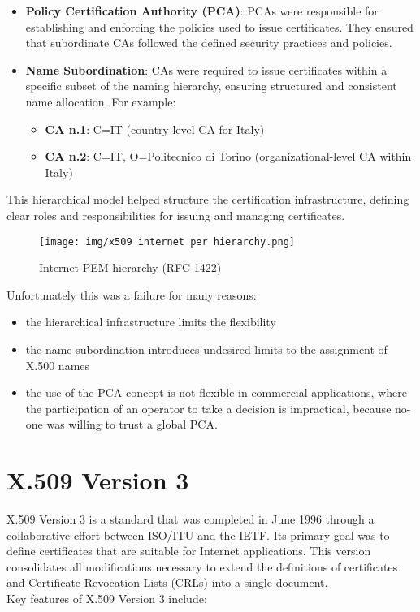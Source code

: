 \begin{itemize}
  \item \textbf{Policy Certification Authority (PCA)}: PCAs were
    responsible for establishing and enforcing the policies used to
    issue certificates. They ensured that subordinate CAs followed
    the defined security practices and policies.

  \item \textbf{Name Subordination}: CAs were required to issue
    certificates within a specific subset of the naming hierarchy,
    ensuring structured and consistent name allocation. For example:
    \begin{itemize}
      \item \textbf{CA n.1}: C=IT (country-level CA for Italy)
      \item \textbf{CA n.2}: C=IT, O=Politecnico di Torino
        (organizational-level CA within Italy)
    \end{itemize}
\end{itemize}

This hierarchical model helped structure the certification
infrastructure, defining clear roles and responsibilities for issuing
and managing certificates.

\begin{figure}[h]
  \centering
  \texttt{[image: img/x509 internet per
  hierarchy.png]}

  \caption{Internet PEM hierarchy (RFC-1422)}
\end{figure}

Unfortunately this was a failure for many reasons:
\begin{itemize}
  \item the hierarchical infrastructure limits the flexibility
  \item the name subordination introduces undesired limits to the
    assignment of X.500 names
  \item the use of the PCA concept is not flexible in commercial
    applications, where the participation of an operator to take a
    decision is impractical, because no-one was willing to trust a
    global PCA.
\end{itemize}

\section{X.509 Version 3}

X.509 Version 3 is a standard that was completed in June 1996 through
a collaborative effort between ISO/ITU and the IETF. Its primary goal
was to define certificates that are suitable for Internet
applications. This version consolidates all modifications necessary to
extend the definitions of certificates and Certificate Revocation
Lists (CRLs) into a single document.\\
Key features of X.509 Version 3 include:

